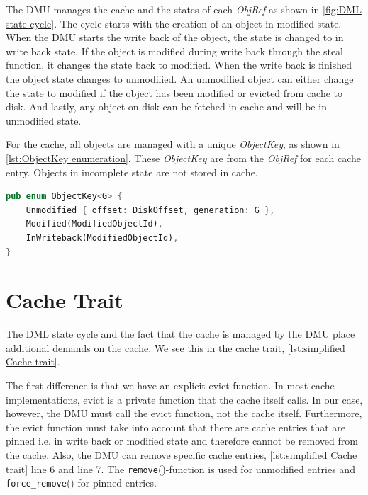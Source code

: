 \documentclass[
	12pt,
	a4paper,
	abstract,
	bibliography=totoc,
	chapterprefix,
	headings=openright,
	numbers=endperiod,
	parskip=half,
	twoside,
]{scrreprt}
\begin{document}
The DMU manages the cache and the states of each \emph{ObjRef} as shown in \ref{fig:DML state cycle}.
The cycle starts with the creation of an object in modified state. When the DMU starts the write back of the object, the state
is changed to in write back state.
If the object is modified during write back through the steal function, it changes the state back to modified.
When the write back is finished the object state changes to unmodified.
An unmodified object can either change the state to modified if the object has been modified or evicted from cache to disk.
And lastly, any object on disk can be fetched in cache and will be in unmodified state.

For the cache, all objects are managed with a unique \emph{ObjectKey}, as shown in \cref{lst:ObjectKey enumeration}.
These \emph{ObjectKey} are  from the \emph{ObjRef} for each cache entry.
Objects in incomplete state are not stored in cache.

\bigskip

\begin{lstlisting}[language=Rust,mathescape=true,caption=ObjectKey enumeration,label=lst:ObjectKey enumeration]
pub enum ObjectKey<G> {
    Unmodified { offset: DiskOffset, generation: G },
    Modified(ModifiedObjectId),
    InWriteback(ModifiedObjectId),
}
\end{lstlisting}

\bigskip

\section{Cache Trait}
\label{sec:cache trait}

The DML state cycle and the fact that the cache is managed by the DMU place additional demands on the cache.
We see this in the cache trait, \cref{lst:simplified Cache trait}.

The first difference is that we have an explicit evict function. 
In most cache implementations, evict is a private function that the cache itself calls.
In our case, however, the DMU must call the evict function, not the cache itself.
Furthermore, the evict function must take into account that there are cache entries that 
are pinned i.e. in write back or modified state and therefore cannot be removed from the cache.
Also, the DMU can remove specific cache entries, \cref{lst:simplified Cache trait} line 6 and line 7.
The \texttt{remove}()-function is used for unmodified entries and \texttt{force\_remove}() for pinned entries.
\end{document}
